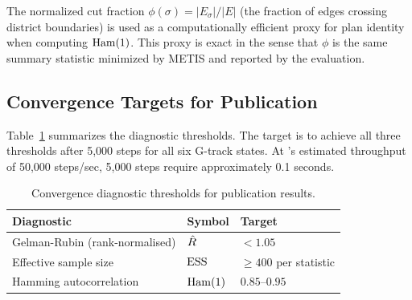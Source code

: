 The normalized cut fraction $\phi(\sigma) = |E_\sigma| / |E|$
(the fraction of edges crossing district boundaries) is used as a
computationally efficient proxy for plan identity when computing
$\mathrm{Ham}(1)$.
This proxy is exact in the sense that $\phi$ is the same summary
statistic minimized by METIS and reported by the \ar{} evaluation.

\subsection{Convergence Targets for Publication}

Table~\ref{tab:diag-targets} summarizes the diagnostic thresholds.
The target is to achieve all three thresholds after 5{,}000 steps for
all six G-track states.
At \re{}'s estimated throughput of 50{,}000 steps/sec, 5{,}000 steps
require approximately 0.1 seconds.

\begin{table}[h]
\centering
\caption{Convergence diagnostic thresholds for \re{} publication results.}
\label{tab:diag-targets}
\begin{tabular}{lll}
\toprule
Diagnostic & Symbol & Target \\
\midrule
Gelman-Rubin (rank-normalised) & $\hat{R}$ & $< 1.05$ \\
Effective sample size & $\mathrm{ESS}$ & $\geq 400$ per statistic \\
Hamming autocorrelation & $\mathrm{Ham}(1)$ & $0.85$--$0.95$ \\
\bottomrule
\end{tabular}
\end{table}
